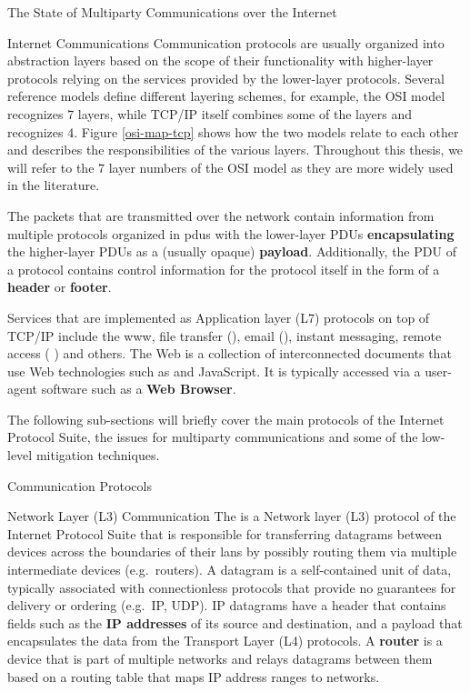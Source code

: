 \begin{frame}[fragile]{The State of Multiparty Communications over the
Internet}
\begin{block}{Internet Communications}
Communication protocols are usually organized into abstraction layers
based on the scope of their functionality with higher-layer protocols
relying on the services provided by the lower-layer protocols. Several
reference models define different layering schemes, for example, the OSI
model recognizes 7 layers, while TCP/IP itself combines some of the
layers and recognizes 4. Figure \ref{osi-map-tcp} shows how the two
models relate to each other and describes the responsibilities of the
various layers. Throughout this thesis, we will refer to the 7 layer
numbers of the OSI model as they are more widely used in the literature.

The packets that are transmitted over the network contain information
from multiple protocols organized in \glspl{pdu} with the lower-layer
PDUs \textbf{encapsulating} the higher-layer PDUs as a (usually opaque)
\textbf{payload}. Additionally, the PDU of a protocol contains control
information for the protocol itself in the form of a \textbf{header} or
\textbf{footer}.

Services that are implemented as Application layer (L7) protocols on top
of TCP/IP include the \gls{www}, file transfer (), email
(), instant messaging, remote access (
\autocite{sshRFC}) and others. The Web is a collection of interconnected
documents that use Web technologies such as  and JavaScript. It
is typically accessed via a user-agent software such as a \textbf{Web
Browser}.

The following sub-sections will briefly cover the main protocols of the
Internet Protocol Suite, the issues for multiparty communications and
some of the low-level mitigation techniques.


\begin{block}{Communication Protocols}
\protect\hypertarget{communication-protocols}{}
\begin{block}{Network Layer (L3) Communication}
\protect\hypertarget{network-layer-l3-communication}{}
The  \autocite{ipv4RFC} is a Network layer (L3) protocol of the
Internet Protocol Suite that is responsible for transferring datagrams
between devices across the boundaries of their \glspl{lan} by possibly
routing them via multiple intermediate devices (e.g.~routers). A
datagram is a self-contained unit of data, typically associated with
connectionless protocols that provide no guarantees for delivery or
ordering (e.g.~IP, UDP).
 IP datagrams
have a header that contains fields such as the \textbf{IP addresses} of
its source and destination, and a
payload that encapsulates the data from the Transport Layer (L4)
protocols. A \textbf{router} is a device that is part of multiple
networks and relays datagrams between them based on a routing table that
maps IP address ranges to networks.
\end{block}


\end{block}
\end{block}
\end{frame}
